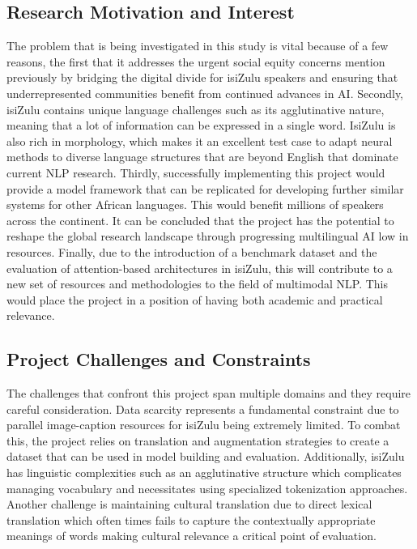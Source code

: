 \documentclass{article}
\begin{document}
\subsection{Research Motivation and Interest}
The problem that is being investigated in this study is vital because of a few reasons, the first that it addresses the urgent social equity concerns mention previously by bridging the digital divide for isiZulu speakers and ensuring that underrepresented communities benefit from continued advances in AI. Secondly, isiZulu contains unique language challenges such as its agglutinative nature, meaning that a lot of information can be expressed in a single word. IsiZulu is also rich in morphology, which makes it an excellent test case to adapt neural methods to diverse language structures that are beyond English that dominate current NLP research. Thirdly, successfully implementing this project would provide a model framework that can be replicated for developing further similar systems for other African languages. This would benefit millions of speakers across the continent. It can be concluded that the project has the potential to reshape the global research landscape through progressing multilingual AI low in resources. Finally, due to the introduction of a benchmark dataset and the evaluation of attention-based architectures in isiZulu, this will contribute to a new set of resources and methodologies to the field of multimodal NLP. This would place the project in a position of having both academic and practical relevance.

\subsection{Project Challenges and Constraints}
The challenges that confront this project span multiple domains and they require careful consideration. Data scarcity represents a fundamental constraint due to parallel image-caption resources for isiZulu being extremely limited. To combat this, the project relies on translation and augmentation strategies to create a dataset that can be used in model building and evaluation. Additionally, isiZulu has linguistic complexities such as an agglutinative structure which complicates managing vocabulary and necessitates using specialized tokenization approaches. Another challenge is maintaining cultural translation due to direct lexical translation which often times fails to capture the contextually appropriate meanings of words making cultural relevance a critical point of evaluation.
\end{document}
